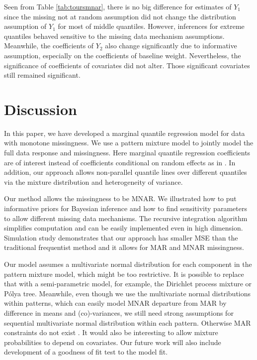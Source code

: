 \documentclass[12pt]{article}
\newcommand{\polya}{P\'{o}lya}
\begin{document}
Seen from Table \ref{tab:toursmnar}, there is no big difference for
estimates of $Y_1$ since the missing not at random assumption did not
change the distribution assumption of $Y_1$ for most of middle
quantiles.  However, inferences for extreme quantiles behaved
sensitive to the missing data mechanism assumptions.  Meanwhile, the
coefficients of $Y_2$ also change significantly due to informative
assumption, especially on the coefficients of baseline
weight. Nevertheless, the significance of coefficients of covariates
did not alter. Those significant covariates still remained
significant.

\section{Discussion}
\label{sec:discussion}

In this paper, we have developed a marginal quantile regression model
for data with monotone missingness. We use a pattern mixture model to
jointly model the full data response and missingness. Here marginal
quantile regression coefficients are of interest instead of
coefficients conditional on random effects as in \citet{yuan2010}. In
addition, our approach allows non-parallel quantile lines over
different quantiles via the mixture distribution and heterogeneity of
variance.

Our method allows the missingness to be MNAR.  We illustrated how to
put informative priors for Bayesian inference and how to find
sensitivity parameters to allow different missing data mechanisms.
The recursive integration algorithm simplifies computation and can be
easily implemented even in high dimension.  Simulation study
demonstrates that our approach has smaller MSE than the traditional
frequentist method and it allows for MAR and MNAR missingness.

Our model assumes a multivariate normal distribution for each
component in the pattern mixture model, which might be too
restrictive. It is possible to replace that with a semi-parametric
model, for example, the Dirichlet process mixture or \polya{} tree.
Meanwhile, even though we use the multivariate normal distributions
within patterns, which can easily model MNAR departure from MAR by
difference in means and (co)-variances, we still need strong
assumptions for sequential multivariate normal distribution within
each pattern. Otherwise MAR constraints do not exist \citep{wang2011}.
It would also be interesting to allow mixture probabilities to depend
on covariates. Our future work will also include development of a
goodness of fit test to the model fit.
\end{document}
